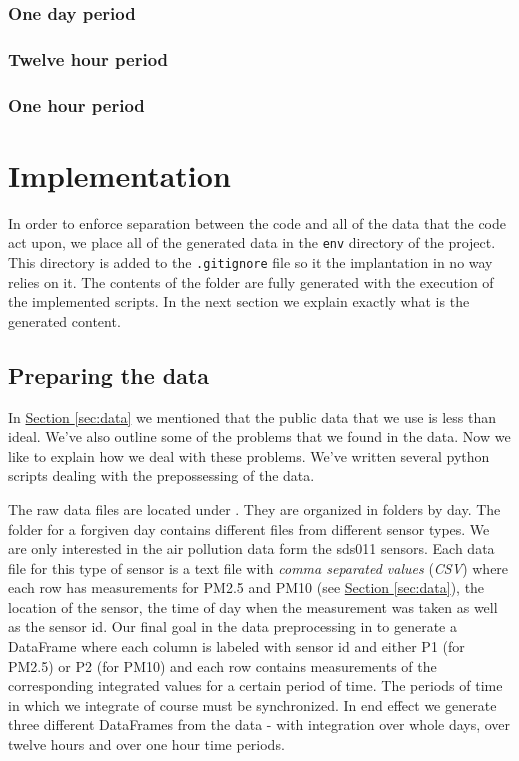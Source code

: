 \documentclass[12pt,a4paper,twoside]{scrartcl}
\numberwithin{equation}{section}
\newcommand{\refsec}[1]{\hyperref[#1]{Section \ref*{#1}}}
\begin{document}
\subsubsection{One day period}
\subsubsection{Twelve hour period}
\subsubsection{One hour period}
\section{Implementation}
\label{sec:impl}
In order to enforce separation between the code and all of the data that the code act upon, we place all of the generated data in the \texttt{env} directory of the project. This directory is added to the \texttt{.gitignore} file so it the implantation in no way relies on it. The contents of the folder are fully generated with the execution of the implemented scripts. In the next section we explain exactly what is the generated content.
\subsection{Preparing the data}
\label{sec:prep-data}
In \refsec{sec:data} we mentioned that the public data that we use is less than ideal. We've also outline some of the problems that we found in the data. Now we like to explain how we deal with these problems. We've written several python scripts dealing with the prepossessing of the data. 

The raw data files are located under \cite{datalink}. They are organized in folders by day. The folder for a forgiven day contains different files from different sensor types. We are only interested in the air pollution data form the sds011 sensors. Each data file for this type of sensor is a text file with \emph{comma separated values} (\emph{CSV}) where each row has measurements for PM2.5 and PM10 (see \refsec{sec:data}), the location of the sensor, the time of day when the measurement was taken as well as the sensor id. Our final goal in the data preprocessing in to generate a DataFrame where each column is labeled with sensor id and either P1 (for PM2.5) or P2 (for PM10) and each row contains measurements of the corresponding integrated values for a certain period of time. The periods of time in which we integrate of course must be synchronized. In end effect we generate three different DataFrames from the data - with integration over whole days, over twelve hours and over one hour time periods.
\end{document}
